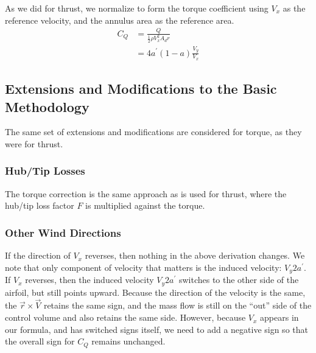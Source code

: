 \documentclass{article}
\begin{document}

As we did for thrust, we normalize to form the torque coefficient using $V_x$ as the reference velocity, and the annulus area as the reference area.
\begin{align}
    C_Q &= \frac{Q}{\frac{1}{2}\rho V_x^2 A_d r}\\
     &= 4 a^\prime (1-a) \frac{V_y}{V_x}
\end{align}

\subsection{Extensions and Modifications to the Basic Methodology}

The same set of extensions and modifications are considered for torque, as they were for thrust.

\subsubsection{Hub/Tip Losses}

The torque correction is the same approach as is used for thrust, where the hub/tip loss factor $F$ is multiplied against the torque.

\subsubsection{Other Wind Directions}

If the direction of $V_x$ reverses, then nothing in the above derivation changes.  We note that only component of velocity that matters is the induced velocity: $V_y 2 a^\prime$.  If $V_x$ reverses, then the induced velocity $V_y 2 a^\prime$ switches to the other side of the airfoil, but still points upward.  Because the direction of the velocity is the same, the $\vec{r} \times \vec{V}$ retains the same sign, and the mass flow is still on the ``out'' side of the control volume and also retains the same side.  However, because $V_x$ appears in our formula, and has switched signs itself, we need to add a negative sign so that the overall sign for $C_Q$ remains unchanged.

\end{document}
